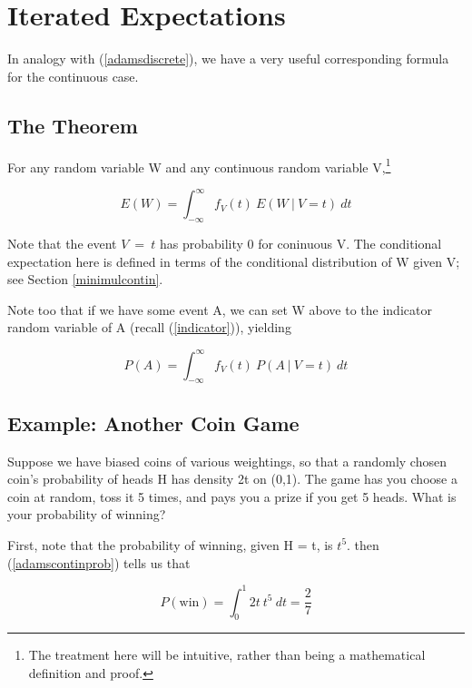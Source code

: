 \section{Iterated Expectations}

In analogy with (\ref{adamsdiscrete}), we have a very useful
corresponding formula for the continuous case.

\subsection{The Theorem}

For any random variable W and any continuous random variable
V,\footnote{The treatment here will be intuitive, rather than being a
mathematical definition and proof.}

\begin{equation}
\label{adamscontin}
E(W) = \int_{-\infty}^{\infty} f_V(t) ~ E(W ~|~ V = t)~ dt
\end{equation}

Note that the event $V ~=~ t$ has probability 0 for coninuous V.  The
conditional expectation here is defined in terms of the conditional
distribution of W given V; see Section \ref{minimulcontin}.

Note too that if we have some event A, we can set W above to the
indicator random variable of A (recall (\ref{indicator})), yielding

\begin{equation}
\label{adamscontinprob}
P(A) = \int_{-\infty}^{\infty} f_V(t) ~ P(A ~|~ V = t)~ dt
\end{equation}

\subsection{Example:  Another Coin Game}

Suppose we have biased coins of various weightings, so that a randomly
chosen coin's probability of heads H has density 2t on (0,1).  The game
has you choose a coin at random, toss it 5 times, and pays you a prize
if you get 5 heads.  What is your probability of winning?

First, note that the probability of winning, given H = t, is $t^5$.
then (\ref{adamscontinprob}) tells us that

\begin{equation}
P(\textrm{win}) = \int_{0}^{1} 2t ~ t^5   ~ dt = \frac{2}{7}
\end{equation}

